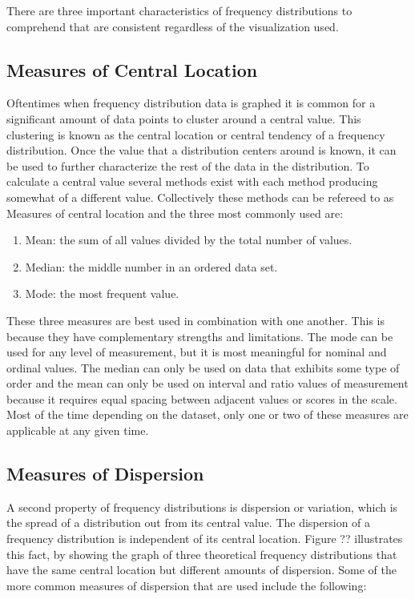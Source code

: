 There are three important characteristics of frequency distributions to comprehend
that are consistent regardless of the visualization used.

\subsection{Measures of Central Location}

Oftentimes when frequency distribution data is graphed it is common for a significant
amount of data points to cluster around a central value. This clustering is known 
as the central location or central tendency of a frequency distribution. Once the 
value that a distribution centers around is known, it can be used to further 
characterize the rest of the data in the distribution. To calculate a central value 
several methods exist with each method producing somewhat of a different value. 
Collectively these methods can be refereed to as Measures of central location and 
the three most commonly used are:

\begin{enumerate}
    \item Mean: the sum of all values divided by the total number of values.
    \item Median: the middle number in an ordered data set.
    \item Mode: the most frequent value.
\end{enumerate}

These three measures are best used in combination with one another. This is because 
they have complementary strengths and limitations. The mode can be used for any 
level of measurement, but it is most meaningful for nominal and ordinal values.
The median can only be used on data that exhibits some type of order and the mean 
can only be used on interval and ratio values of measurement because it requires 
equal spacing between adjacent values or scores in the scale. Most of the time 
depending on the dataset, only one or two of these measures are applicable at any 
given time.

\subsection{Measures of Dispersion}

A second property of frequency distributions is dispersion or variation, which is 
the spread of a distribution out from its central value. The dispersion of a frequency 
distribution is independent of its central location. Figure ?? illustrates this 
fact, by showing the graph of three theoretical frequency distributions that have 
the same central location but different amounts of dispersion. Some of the more common
measures of dispersion that are used include the following:


